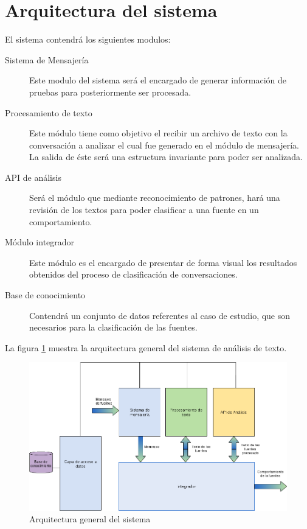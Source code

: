 \section{Arquitectura del sistema}

El sistema contendr\'a los siguientes modulos:
\begin{description}
\item[Sistema de Mensajer\'ia] Este modulo del sistema ser\'a el encargado de generar informaci\'on de pruebas para posteriormente ser procesada.

\item[Procesamiento de texto] Este m\'odulo tiene como objetivo el recibir un archivo de texto con la conversaci\'on a analizar el cual fue generado en el m\'odulo de mensajer\'ia. La salida de \'este ser\'a una estructura invariante para poder ser analizada.

\item[API de an\'alisis] Ser\'a el módulo que mediante reconocimiento de patrones, har\'a una revisión de los textos para poder clasificar a una fuente en un comportamiento.

\item[M\'odulo integrador]Este m\'odulo es el encargado de presentar de forma visual los resultados obtenidos del proceso de clasificación de conversaciones. 

\item[Base de conocimiento] Contendr\'a  un conjunto de datos referentes al caso de estudio, que son necesarios para la clasificación de las fuentes. 

\end{description}


La figura \ref{arquitectura} muestra la arquitectura general del sistema de an\'alisis de texto.
\begin{figure}[h]
\begin{center}

    \includegraphics[scale=.5]{images/arquitectura}
  \caption{Arquitectura general del sistema}
  \label{arquitectura}
  \end{center}
\end{figure}